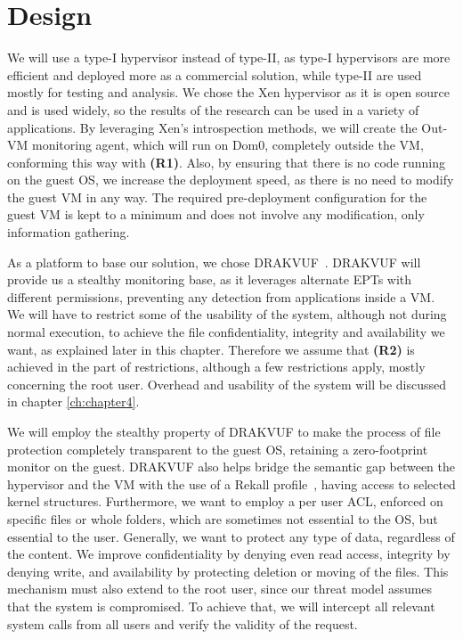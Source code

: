 \section{Design}\label{sec:design}

\par We will use a type-I hypervisor instead of type-II, as type-I hypervisors are more efficient and deployed more as a commercial solution, while type-II are used mostly for testing and analysis. We chose the Xen hypervisor as it is open source and is used widely, so the results of the research can be used in a variety of applications. By leveraging Xen's introspection methods, we will create the Out-VM monitoring agent, which will run on Dom0, completely outside the \ac{VM}, conforming this way with \textbf{(R1)}. Also, by ensuring that there is no code running on the guest \ac{OS}, we increase the deployment speed, as there is no need to modify the guest \ac{VM} in any way. The required pre-deployment configuration for the guest \ac{VM} is kept to a minimum and does not involve any modification, only information gathering.

\par As a platform to base our solution, we chose DRAKVUF~\cite{lengyel2014drakvuf}. DRAKVUF will provide us a stealthy monitoring base, as it leverages alternate \ac{EPT}s with different permissions, preventing any detection from applications inside a \ac{VM}. We will have to restrict some of the usability of the system, although not during normal execution, to achieve the file confidentiality, integrity and availability we want, as explained later in this chapter. Therefore we assume that \textbf{(R2)} is achieved in the part of restrictions, although a few restrictions apply, mostly concerning the root user. Overhead and usability of the system will be discussed in chapter \ref{ch:chapter4}.

\par We will employ the stealthy property of DRAKVUF to make the process of file protection completely transparent to the guest \ac{OS}, retaining a zero-footprint monitor on the guest. DRAKVUF also helps bridge the semantic gap between the hypervisor and the \ac{VM} with the use of a Rekall profile~\cite{rekall}, having access to selected kernel structures. Furthermore, we want to employ a per user \ac{ACL}, enforced on specific files or whole folders, which are sometimes not essential to the \ac{OS}, but essential to the user. Generally, we want to protect any type of data, regardless of the content. We improve confidentiality by denying even read access, integrity by denying write, and availability by protecting deletion or moving of the files. This mechanism must also extend to the root user, since our threat model assumes that the system is compromised. To achieve that, we will intercept all relevant system calls from all users and verify the validity of the request. 

